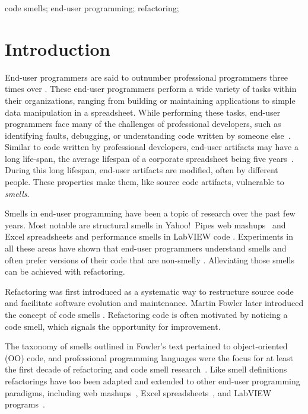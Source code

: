 \documentclass[10pt,conference,compsocconf]{IEEEtran}
\begin{document}
\begin{IEEEkeywords}
code smells;
end-user programming;
refactoring;
\end{IEEEkeywords}

\section{Introduction}
End-user programmers are said to outnumber  professional programmers three times over \cite{Scaf2005}.
These end-user programmers perform a wide variety of tasks within their organizations, ranging from building or maintaining applications to simple data manipulation in a spreadsheet.
While performing these tasks, end-user programmers face many of the challenges of professional developers, such as identifying faults, debugging, or understanding code written by someone else~\cite{Ko2011}.
Similar to code written by professional developers, end-user artifacts may have a long life-span, the average lifespan of a corporate spreadsheet being five years~\cite{Hermans2011}.
During this long lifespan, end-user artifacts are modified, often by different people.
These properties make them, like source code artifacts, vulnerable to \emph{smells}. 

Smells in end-user programming have been a topic of research over the past few years. Most notable are structural smells in Yahoo!\ Pipes web mashups~\cite{Stolee2011} and  Excel spreadsheets \cite{Hermans2012inter} and performance smells in LabVIEW code \cite{chambers2013smell}.
Experiments in all these areas have shown that end-user programmers understand smells and often prefer versions of their code that are non-smelly \cite{Hermans2012intra, StoleeTSE2013, chambers2013smell}.
Alleviating those smells can be achieved with refactoring.

Refactoring was first introduced as a systematic way to restructure source code and facilitate software evolution and maintenance. Martin Fowler later introduced the concept of code smells \cite{Fowl1999}. 
Refactoring code is often motivated by noticing a code smell, which signals the opportunity for improvement.

The taxonomy of smells outlined in Fowler's text pertained  to object-oriented (OO) code, and professional programming languages were the focus for at least the first decade of refactoring and code smell research~\cite{Mens:2004:SSR:972215.972286}.
Like smell definitions refactorings have too been adapted and extended to other 
end-user programming paradigms, including web mashups~\cite{Stolee2011, StoleeTSE2013}, Excel spreadsheets~\cite{Hermans2011, Hermans2012inter, hermans2014bumblebee}, and LabVIEW programs~\cite{chambers2013smell}.
\end{document}
